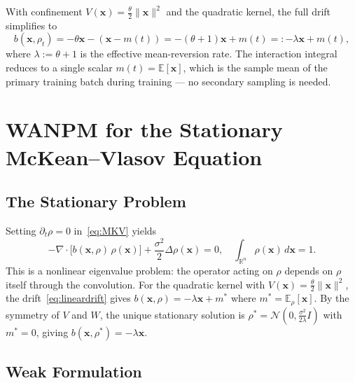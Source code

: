 \documentclass[12pt]{article}
\newcommand{\bx}{\mathbf{x}}
\newcommand{\E}{\mathbb{E}}
\newcommand{\Rn}{\mathbb{R}^n}
\theoremstyle{plain}
\begin{document}
With confinement $V(\bx)=\frac{\theta}{2}\|\bx\|^2$ and the quadratic kernel, the full
drift simplifies to
\begin{equation}
  b(\bx,\rho_t) = -\theta\bx - (\bx - m(t))
  = -(\theta+1)\bx + m(t) =: -\lambda\bx + m(t),
  \label{eq:lineardrift}
\end{equation}
where $\lambda:=\theta+1$ is the effective mean-reversion rate. The interaction integral
reduces to a single scalar $m(t)=\E[\bx]$, which is the sample mean of the primary
training batch during training --- no secondary sampling is needed.

\section{WANPM for the Stationary McKean--Vlasov Equation}
\label{sec:stationary}

\subsection{The Stationary Problem}

Setting $\partial_t\rho=0$ in~\eqref{eq:MKV} yields
\begin{equation}
  -\nabla\cdot\bigl[b(\bx,\rho)\,\rho(\bx)\bigr]
  + \frac{\sigma^2}{2}\Delta\rho(\bx) = 0,
  \quad \int_{\Rn}\rho(\bx)\,d\bx=1.
  \label{eq:stationary}
\end{equation}
This is a nonlinear eigenvalue problem: the operator acting on $\rho$ depends on $\rho$
itself through the convolution. For the quadratic kernel with $V(\bx)=\frac{\theta}{2}\|\bx\|^2$,
the drift~\eqref{eq:lineardrift} gives $b(\bx,\rho)=-\lambda\bx+m^*$ where
$m^*=\E_\rho[\bx]$. By the symmetry of $V$ and $W$, the unique stationary solution is
$\rho^*=\mathcal{N}(0,\frac{\sigma^2}{2\lambda}I)$ with $m^*=0$, giving
$b(\bx,\rho^*)=-\lambda\bx$.

\subsection{Weak Formulation}
\label{sec:weakstat}
\end{document}
